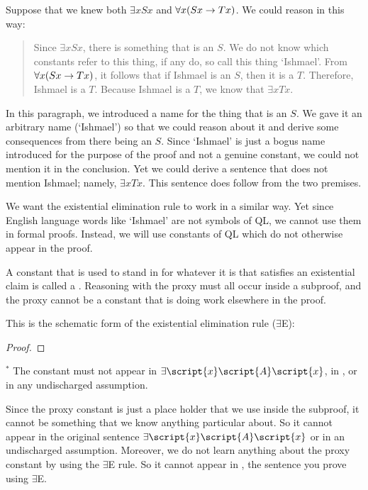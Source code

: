 Suppose that we knew both $\exists x Sx$ and $\forall x(Sx \rightarrow Tx)$. We could reason in this way:
\begin{quote}
Since $\exists x Sx$, there is something that is an $S$. We do not know which constants refer to this thing, if any do, so call this thing `Ishmael'. From $\forall x(Sx \rightarrow Tx)$, it follows that if Ishmael is an $S$, then it is a $T$. Therefore, Ishmael is a $T$.  Because Ishmael is a $T$, we know that $\exists x Tx$.
\end{quote}
In this paragraph, we introduced a name for the thing that is an $S$. We gave it an arbitrary name (`Ishmael') so that we could reason about it and derive some consequences from there being an $S$. Since `Ishmael' is just a bogus name introduced for the purpose of the proof and not a genuine constant, we could not mention it in the conclusion. Yet we could derive a sentence that does not mention Ishmael; namely, $\exists x Tx$. This sentence does follow from the two premises.

We want the existential elimination rule to work in a similar way. Yet since English language words like `Ishmael' are not symbols of QL, we cannot use them in formal proofs. Instead, we will use constants of QL which do not otherwise appear in the proof.

A constant that is used to stand in for whatever it is that satisfies an existential claim is called a . Reasoning with the proxy must all occur inside a subproof, and the proxy cannot be a constant that is doing work elsewhere in the proof.

This is the schematic form of the existential elimination rule ($\exists$E): 

\begin{proof}
	\open	
	\close
	 
\end{proof}
$^\ast$ The constant  must not appear in $\exists\script{x}\script{A}\script{x}$, in , or in any undischarged assumption.

Since the proxy constant is just a place holder that we use inside the subproof, it cannot be something that we know anything particular about. So it cannot appear in the original sentence $\exists\script{x}\script{A}\script{x}$ or in an undischarged assumption. Moreover, we do not learn anything about the proxy constant by using the $\exists$E rule. So it cannot appear in , the sentence you prove using $\exists$E.

